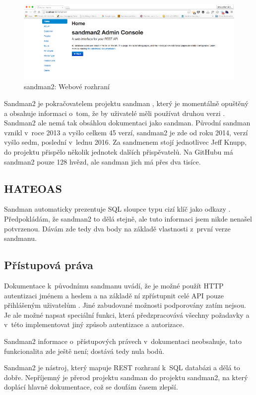 \begin{figure}
\centering
\includegraphics{images/sandman}
\caption{sandman2: Webové rozhraní \autocite{sandmanpic}\label{pic:sandman}}
\end{figure}

Sandman2 je pokračovatelem projektu sandman \autocite{sandman1}, který je momentálně opuštěný a obsahuje informaci o~tom, že by uživatelé měli používat druhou verzi \autocite{sandman1gh}. Sandman2 ale nemá tak obsáhlou dokumentaci jako sandman. Původní sandman vznikl v~roce 2013 a vyšlo celkem 45 verzí, sandman2 je zde od roku 2014, verzí vyšlo sedm, poslední v~lednu 2016. Za sandmenem stojí jednotlivec Jeff Knupp, do projektu přispělo několik jednotek dalších přispěvatelů. Na GitHubu má sandman2 pouze 128 hvězd, ale sandman jich má přes dva tisíce.

\subsection{HATEOAS}\label{hateoas}

Sandman automaticky prezentuje SQL sloupce typu cizí klíč jako odkazy \autocite{sandman1gh}. Předpokládám, že sandman2 to dělá stejně, ale tuto informaci jsem nikde nenašel potvrzenou. Dávám zde tedy dva body na základě vlastnosti z~první verze sandmanu.

\subsection{Přístupová práva}\label{pux159uxedstupovuxe1-pruxe1va}

Dokumentace k~původnímu sandmanu uvádí, že je možné použít HTTP autentizaci jménem a heslem a na základě ní zpřístupnit celé API pouze přihlášeným uživatelům \autocite{sandmanauth}. Jiné zabudované možnosti podporovány zatím nejsou. Je ale možné napsat speciální funkci, která předzpracovává všechny požadavky a v~této implementovat jiný způsob autentizace a autorizace.

Sandman2 informace o~přístupových právech v~dokumentaci neobsahuje, tato funkcionalita zde ještě není; dostává tedy nula bodů.

Sandman2 je nástroj, který mapuje REST rozhraní k~SQL databázi a dělá to dobře. Nepříjemný je přerod projektu sandman do projektu sandman2, na který doplácí hlavně dokumentace, což se doufám časem zlepší.
